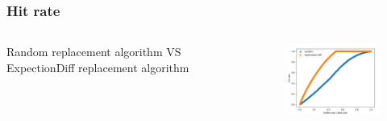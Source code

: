 \documentclass[notheorems, aspectratio=54]{beamer}
\begin{document}
\begin{frame}
    \frametitle{Hit rate}
    \begin{columns}
        \begin{column}{0.48\textwidth}
            Random replacement algorithm VS ExpectionDiff replacement algorithm
        \end{column}
        \begin{column}{0.48\textwidth}
            \begin{figure}
                \centering
                \includegraphics[width=6cm]{global_img_dir/replacement_vs.png}
                \caption{}
            \end{figure}
        \end{column}
    \end{columns}
\end{frame}
\end{document}
